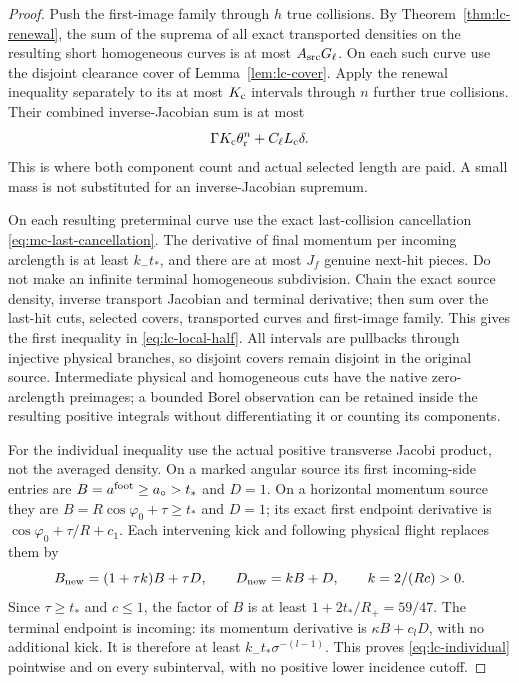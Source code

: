 \begin{proof}
Push the first-image family through $h$ true collisions.  By
Theorem~\ref{thm:lc-renewal}, the sum of the suprema of all exact
transported densities on the resulting short homogeneous curves
is at most $A_{\rm src}G_\ell$.  On each such curve use the disjoint
clearance cover of Lemma~\ref{lem:lc-cover}.  Apply the renewal
inequality separately to its at most $K_{\rm c}$ intervals through
$n$ further true collisions.  Their combined inverse-Jacobian sum
is at most
\[
                 \Gamma K_{\rm c}\theta_{\rm r}^n
                            +C_\ell L_{\rm c}\delta.
\]
This is where both component count and actual selected length are
paid.  A small mass is not substituted for an inverse-Jacobian
supremum.

On each resulting preterminal curve use the exact last-collision
cancellation \eqref{eq:mc-last-cancellation}.  The derivative of
final momentum per incoming arclength is at least $k_-t_*$, and
there are at most $J_f$ genuine next-hit pieces.  Do not make an
infinite terminal homogeneous subdivision.  Chain the exact source
density, inverse transport Jacobian and terminal derivative; then
sum over the last-hit cuts, selected covers, transported curves and
first-image family.  This gives the first inequality in
\eqref{eq:lc-local-half}.  All intervals are pullbacks through
injective physical branches, so disjoint covers remain disjoint
in the original source.  Intermediate physical and homogeneous
cuts have the native zero-arclength preimages; a bounded Borel
observation can be retained inside the resulting positive integrals
without differentiating it or counting its components.

For the individual inequality use the actual positive transverse
Jacobi product, not the averaged density.  On a marked angular
source its first incoming-side entries are $B=a^{\rm foot}\ge
 a_\circ>t_*$ and $D=1$.  On a horizontal momentum source they
are $B=R\cos\varphi_0+\tau\ge t_*$ and $D=1$; its exact first
endpoint derivative is $\cos\varphi_0+\tau/R+c_1$.
Each intervening kick and following physical flight replaces them by
\[
 B_{\rm new}=(1+\tau k)B+\tau D,\qquad
 D_{\rm new}=kB+D,\qquad k=2/(Rc)>0.
\]
Since $\tau\ge t_*$ and $c\le1$, the factor of $B$ is at least
$1+2t_*/R_+=59/47$.  The terminal endpoint is incoming: its
momentum derivative is $\kappa B+c_lD$, with no additional kick.
It is therefore at least $k_-t_*\sigma^{-(l-1)}$.
This proves \eqref{eq:lc-individual} pointwise and on every
subinterval, with no positive lower incidence cutoff.


\end{proof}
